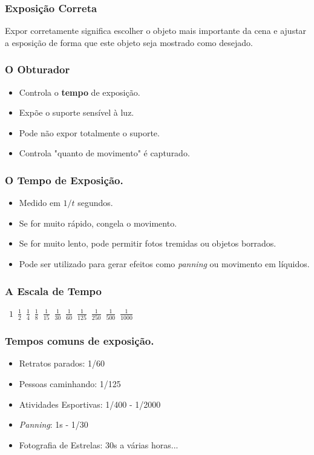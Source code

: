 \begin{frame}
    \frametitle{Exposição Correta}
    Expor corretamente significa escolher o objeto mais importante da cena e
    ajustar a esposição de forma que este objeto seja mostrado como desejado.
\end{frame}

\begin{frame}
    \frametitle{O Obturador}
    \begin{itemize}
        \item Controla o \textbf{tempo} de exposição.
        \item Expõe o suporte sensível à luz.
        \item Pode não expor totalmente o suporte.
        \item Controla "quanto de movimento" é capturado.
    \end{itemize}
\end{frame}

\begin{frame}
    \frametitle{O Tempo de Exposição.}
    \begin{itemize}
        \item Medido em $1/t$ segundos.
        \item Se for muito rápido, congela o movimento.
        \item Se for muito lento, pode permitir fotos tremidas ou objetos borrados.
        \item Pode ser utilizado para gerar efeitos como \textit{panning} ou movimento em líquidos.
    \end{itemize}
\end{frame}

\begin{frame}
    \frametitle{A Escala de Tempo}
    \vfill
    \begin{center}
    \mbox{
    \huge $1$
    \hfill
    \huge $\frac{1}{2}$
    \hfill
    \huge $\frac{1}{4}$
    \hfill
    \huge $\frac{1}{8}$
    \hfill
    \huge $\frac{1}{15}$
    \hfill
    \huge $\frac{1}{30}$
    \hfill
    \huge $\frac{1}{60}$
    \hfill
    \huge $\frac{1}{125}$
    \hfill
    \huge $\frac{1}{250}$
    \hfill
    \huge $\frac{1}{500}$
    \hfill
    \huge $\frac{1}{1000}$
    }
    \end{center}
    \vfill
\end{frame}

\begin{frame}
    \frametitle{Tempos comuns de exposição.}
    \begin{itemize}
        \item Retratos parados: 1/60
        \item Pessoas caminhando: 1/125
        \item Atividades Esportivas: 1/400 - 1/2000
        \item \textit{Panning}: 1s - 1/30
        \item Fotografia de Estrelas: 30s a várias horas...
    \end{itemize}
\end{frame}

